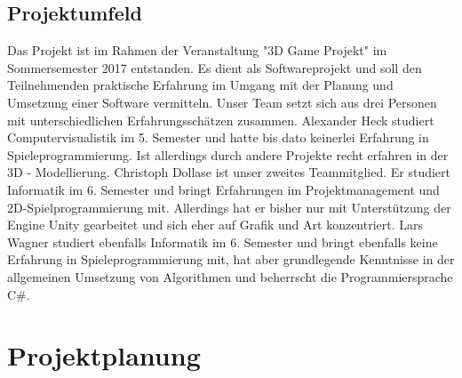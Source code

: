 \documentclass[12pt]{article}
\begin{document}
\vspace{2cm}
\subsection{Projektumfeld}
Das Projekt ist im Rahmen der Veranstaltung "3D Game Projekt" im Sommersemester 2017 entstanden. Es dient als Softwareprojekt und soll den Teilnehmenden praktische Erfahrung im Umgang mit der Planung und Umsetzung einer Software vermitteln. Unser Team setzt sich aus drei Personen mit unterschiedlichen Erfahrungsschätzen zusammen. \newline
Alexander Heck studiert Computervisualistik im 5. Semester und hatte bis dato keinerlei Erfahrung in Spieleprogrammierung. Ist allerdings durch andere Projekte recht erfahren in der 3D - Modellierung. \newline
Christoph Dollase ist unser zweites Teammitglied. Er studiert Informatik im 6. Semester und bringt Erfahrungen im Projektmanagement und 2D-Spielprogrammierung mit. Allerdings hat er bisher nur mit Unterstützung der Engine Unity gearbeitet und sich eher auf Grafik und Art konzentriert. \newline
Lars Wagner studiert ebenfalls Informatik im 6. Semester und bringt ebenfalls keine Erfahrung in Spieleprogrammierung mit, hat aber grundlegende Kenntnisse in der allgemeinen Umsetzung von Algorithmen und beherrscht die Programmiersprache C\#.


\newpage
\section{Projektplanung}
\end{document}
